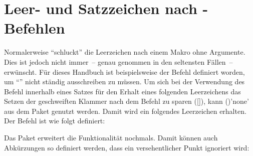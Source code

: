 \section{Leer- und Satzzeichen nach -Befehlen}%
%
%
%
Normalerweise \enquote{schluckt}  die Leerzeichen nach einem 
Makro ohne Argumente. Dies ist jedoch nicht immer~-- genau genommen in den 
seltensten Fällen~-- erwünscht. Für dieses Handbuch ist beispielsweise der 
Befehl  definiert worden, um \enquote{\TUD{}} nicht ständig 
ausschreiben zu müssen. Um sich bei der Verwendung des Befehl innerhalb eines 
Satzes für den Erhalt eines folgenden Leerzeichens das Setzen der geschweiften 
Klammer nach dem Befehl zu sparen ([\PParameter{}]), kann 
()'none' aus dem Paket  genutzt 
werden. Damit wird ein folgendes Leerzeichen erhalten. Der Befehl  
ist wie folgt definiert:
%
\begin{quoting}
\begin{Code}
\newcommand*{\TUD}{Technische Universit\"at Dresden\xspace}
\end{Code}
\end{quoting}
%
Das Paket  erweitert die Funktionalität nochmals. Damit 
können auch Abkürzungen so definiert werden, dass ein versehentlicher Punkt 
ignoriert wird:
%
\begin{quoting}
\begin{Code}
\newcommand*{\zB}{z.\,B\xperiod}
\end{Code}
\end{quoting}



